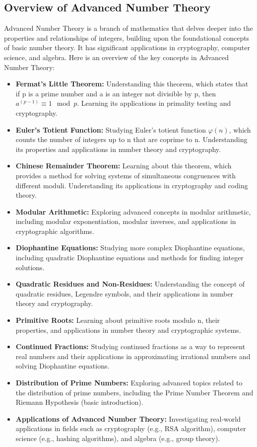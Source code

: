 \documentclass[openany]{book}
\begin{document}
\subsection{Overview of Advanced Number Theory}
Advanced Number Theory is a branch of mathematics that delves deeper into the properties and relationships of integers, building upon the foundational concepts of basic number theory. It has significant applications in cryptography, computer science, and algebra. Here is an overview of the key concepts in Advanced Number Theory:
\begin{itemize}
    \item \textbf{Fermat's Little Theorem:} Understanding this theorem, which states that if p is a prime number and a is an integer not divisible by p, then \(a^{(p-1)} \equiv 1 \mod p\). Learning its applications in primality testing and cryptography.
    \item \textbf{Euler's Totient Function:} Studying Euler's totient function \(\varphi(n)\), which counts the number of integers up to n that are coprime to n. Understanding its properties and applications in number theory and cryptography.
    \item \textbf{Chinese Remainder Theorem:} Learning about this theorem, which provides a method for solving systems of simultaneous congruences with different moduli. Understanding its applications in cryptography and coding theory.
    \item \textbf{Modular Arithmetic:} Exploring advanced concepts in modular arithmetic, including modular exponentiation, modular inverses, and applications in cryptographic algorithms.
    \item \textbf{Diophantine Equations:} Studying more complex Diophantine equations, including quadratic Diophantine equations and methods for finding integer solutions.
    \item \textbf{Quadratic Residues and Non-Residues:} Understanding the concept of quadratic residues, Legendre symbols, and their applications in number theory and cryptography.
    \item \textbf{Primitive Roots:} Learning about primitive roots modulo n, their properties, and applications in number theory and cryptographic systems.
    \item \textbf{Continued Fractions:} Studying continued fractions as a way to represent real numbers and their applications in approximating irrational numbers and solving Diophantine equations.
    \item \textbf{Distribution of Prime Numbers:} Exploring advanced topics related to the distribution of prime numbers, including the Prime Number Theorem and Riemann Hypothesis (basic introduction).
    \item \textbf{Applications of Advanced Number Theory:} Investigating real-world applications in fields such as cryptography (e.g., RSA algorithm), computer science (e.g., hashing algorithms), and algebra (e.g., group theory).
\end{itemize}
\end{document}
